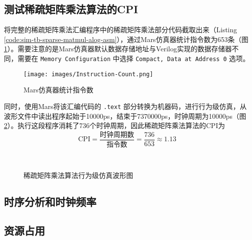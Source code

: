 \subsection{测试稀疏矩阵乘法算法的CPI}
将完整的稀疏矩阵乘法汇编程序中的稀疏矩阵乘法部分代码截取出来（Listing \ref{code:sim-tb-sparse-matmul-alog-asm}），通过Mars仿真器统计指令数为653条（图 \ref{fig:instruction-count}）。需要注意的是Mars仿真器默认数据存储地址与Verilog实现的数据存储器不同，需要在 \lstinline|Memory Configuration| 中选择 \lstinline|Compact, Data at Address 0| 选项。
\begin{figure}[H]
    \centering
    \texttt{[image: images/Instruction-Count.png]}
    \vspace{-2em}
    \caption{Mars仿真器统计指令数}
    \label{fig:instruction-count}
\end{figure}
同时，使用Mars将该汇编代码的 \lstinline|.text| 部分转换为机器码，进行行为级仿真，从波形文件中读出程序起始于10000ps，结束于7370000ps，时钟周期为10000ps（图 \ref{fig:simulation-time}）。执行这段程序消耗了736个时钟周期，因此稀疏矩阵乘法算法的CPI为
\begin{equation}
    \text{CPI} = \frac{\text{时钟周期数}}{\text{指令数}} = \frac{736}{653} \approx 1.13
\end{equation}
\begin{figure}[H]
    \centering
    \\
    \vspace{-1em}
    \caption{稀疏矩阵乘法算法行为级仿真波形图}
    \label{fig:simulation-time}
\end{figure}

\subsection{时序分析和时钟频率}

\subsection{资源占用}
